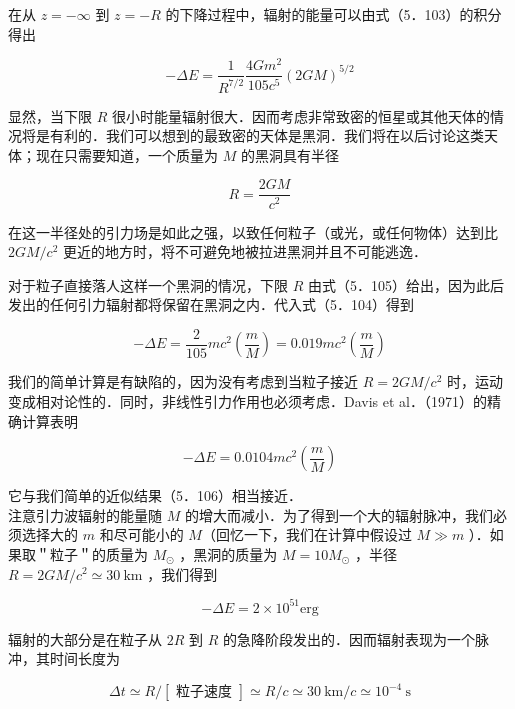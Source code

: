 在从 $z=-\infty$ 到 $z=-R$ 的下降过程中，辐射的能量可以由式（5．103）的积分得出


\begin{equation*}
	-\Delta E=\frac{1}{R^{7 / 2}} \frac{4 G m^{2}}{105 c^{5}}(2 G M)^{5 / 2} \tag{5.104}
\end{equation*}


显然，当下限 $R$ 很小时能量辐射很大．因而考虑非常致密的恒星或其他天体的情况将是有利的．我们可以想到的最致密的天体是黑洞．我们将在以后讨论这类天体；现在只需要知道，一个质量为 $M$ 的黑洞具有半径


\begin{equation*}
	R=\frac{2 G M}{c^{2}} \tag{5.105}
\end{equation*}


在这一半径处的引力场是如此之强，以致任何粒子（或光，或任何物体）达到比 $2 G M / c^{2}$ 更近的地方时，将不可避免地被拉进黑洞并且不可能逃逸．

对于粒子直接落人这样一个黑洞的情况，下限 $R$ 由式（5．105）给出，因为此后发出的任何引力辐射都将保留在黑洞之内．代入式（5．104）得到


\begin{equation*}
	-\Delta E=\frac{2}{105} m c^{2}\left(\frac{m}{M}\right)=0.019 m c^{2}\left(\frac{m}{M}\right) \tag{5.106}
\end{equation*}


我们的简单计算是有缺陷的，因为没有考虑到当粒子接近 $R=2 G M / c^{2}$ 时，运动变成相对论性的．同时，非线性引力作用也必须考虑．Davis et al．（1971）的精确计算表明


\begin{equation*}
	-\Delta E=0.0104 m c^{2}\left(\frac{m}{M}\right) \tag{5.107}
\end{equation*}


它与我们简单的近似结果（5．106）相当接近．\\
注意引力波辐射的能量随 $M$ 的增大而减小．为了得到一个大的辐射脉冲，我们必须选择大的 $m$ 和尽可能小的 $M$（回忆一下，我们在计算中假设过 $M \gg m$ ）．如果取＂粒子＂的质量为 $M_{\odot}$ ，黑洞的质量为 $M=10 M_{\odot}$ ，半径 $R=2 G M / c^{2} \simeq 30 \mathrm{~km}$ ，我们得到


\begin{equation*}
	-\Delta E=2 \times 10^{51} \mathrm{erg} \tag{5.108}
\end{equation*}


辐射的大部分是在粒子从 $2 R$ 到 $R$ 的急降阶段发出的．因而辐射表现为一个脉冲，其时间长度为


\begin{equation*}
	\Delta t \simeq R /[\text { 粒子速度 }] \simeq R / c \simeq 30 \mathrm{~km} / c \simeq 10^{-4} \mathrm{~s} \tag{5.109}
\end{equation*}


